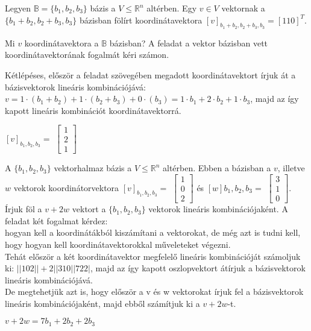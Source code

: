 \begin{frame}
  \begin{tcolorbox}[title={1/2. -R-}]
      Legyen $\mathbb{B} = \{b_1,b_2,b_3\}$ bázis a $V \leq \mathbb{R}^n$ altérben. Egy $v \in V$ vektornak a $\{b_1 + b_2,b_2 + b_3,b_3\}$ bázisban fölírt koordinátavektora $[v]_{b_1+b_2,b_2+b_3,b_3} = [1 1 0]^T$.\\
      \mmedskip
      
      Mi $v$ koordinátavektora a $\mathbb{B}$ bázisban?
  \tcblower
    A feladat a vektor bázisban vett koordinátavektorának fogalmát kéri számon.\\
    \mmedskip
   
    Kétlépéses, először a feladat szövegében megadott koordinátavektort írjuk át a bázisvektorok lineáris kombinációjává: $v = 1 \cdot (b_1 + b_2) + 1 \cdot (b_2 + b_3) + 0 \cdot (b_3) = 1 \cdot b_1 + 2 \cdot b_2 + 1 \cdot b_3$, majd az így kapott lineáris kombinációt koordinátavektorrá.\\
     \mmedskip
     
   $[v]_{b_1,b_2,b_3} =$ $\begin{bmatrix} 
  				1  \\
  				2 \\
  				1
			\end{bmatrix}$
  \end{tcolorbox}
\end{frame}

\begin{frame}
  \begin{tcolorbox}[title={1/3. -R-}]
      A $\{b_1,b_2,b_3\}$ vektorhalmaz bázis a $V \leq \mathbb{R}^n$ altérben. Ebben a bázisban a $v$, illetve $w$ vektorok koordinátorvektora $[v]_{b_1,b_2,b_3} = $ $\begin{bmatrix} 
  				1  \\
  				0 \\
  				2
			\end{bmatrix}$ és $[w]{b_1,b_2,b_3} = $ $\begin{bmatrix} 
  				3  \\
  				1 \\
  				0
			\end{bmatrix}$. Írjuk föl a $v+2w$ vektort a $\{b_1,b_2,b_3\}$ vektorok lineáris kombinációjaként.
  \tcblower
    A feladat két fogalmat kérdez:\\
      hogyan kell a koordinátákból kiszámítani a vektorokat, de még azt is tudni kell, hogy hogyan kell koordinátavektorokkal műveleteket végezni.\\
      
      Tehát először a két koordinátavektor megfelelő lineáris kombinációját számoljuk ki: $| | 1 0 2  |  |+   2 | | 3 1 0 | | 7 2 2 |$, majd az így kapott oszlopvektort átírjuk a bázisvektorok lineáris kombinációjává.\\
      
      De megtehetjük azt is, hogy először a v és w vektorokat írjuk fel a bázisvektorok lineáris kombinációjaként, majd ebből számítjuk ki a $v+2w$-t.
      
   $v + 2w = 7b_1 + 2b_2 + 2b_3$
  \end{tcolorbox}
\end{frame}
  
